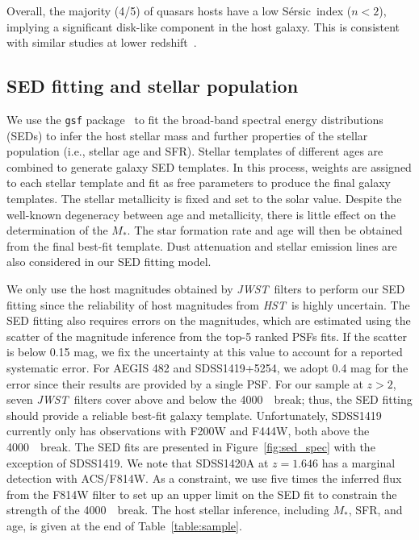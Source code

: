 \documentclass[twocolumn]{aastex631}
\newcommand{\sersic}{S\'ersic}
\newcommand{\smass}{{$M_*$}}
\newcommand{\hst}{{\it HST}}
\newcommand{\jwst}{{\it JWST}}
\newcommand{\angstrom}{\text{\normalfont\AA}}
\begin{document}
Overall, the majority (4/5) of quasars hosts have a low \sersic\ index ($n<2$), implying a significant disk-like component in the host galaxy. This is consistent with similar studies at lower redshift~\citep[e.g.,][]{Schawinski2012,Ding2020,Li2021,Zhuang2022}.


\subsection{SED fitting and stellar population}


We use the \texttt{gsf} package~\citep{Morishita2019} to fit the broad-band spectral energy distributions (SEDs) to infer the host stellar mass and further properties of the stellar population (i.e., stellar age and SFR). 
Stellar templates of different ages are combined to generate galaxy SED templates. In this process, weights are assigned to each stellar template and fit as free parameters to produce the final galaxy templates.
The stellar metallicity is fixed and set to the solar value. Despite the well-known degeneracy between age and metallicity, there is little effect on the determination of the \smass. The star formation rate and age will then be obtained from the final best-fit template. Dust attenuation and stellar emission lines are also considered in our SED fitting model.

We only use the host magnitudes obtained by \jwst\ filters to perform our SED fitting since the reliability of host magnitudes from \hst\ is highly uncertain. 
The SED fitting also requires errors on the magnitudes, which are estimated using the scatter of the magnitude inference from the top-5 ranked PSFs fits. If the scatter is below 0.15 mag, we fix the uncertainty at this value to account for a reported systematic error. For AEGIS 482 and SDSS1419+5254, we adopt 0.4 mag for the error since their results are provided by a single PSF.
For our sample at $z>2$, seven \jwst\ filters cover above and below the 4000~\angstrom\ break; thus, the SED fitting should provide a reliable best-fit galaxy template. Unfortunately, SDSS1419 currently only has observations with F200W and F444W, both above the 4000~\angstrom\ break. The SED fits are presented in Figure~\ref{fig:sed_spec} with the exception of SDSS1419. We note that SDSS1420A at $z=1.646$ has a marginal detection with ACS/F814W. As a constraint, we use five times the inferred flux from the F814W filter to set up an upper limit on the SED fit to constrain the strength of the 4000~\angstrom\ break. The host stellar inference, including \smass, SFR, and age, is given at the end of Table~\ref{table:sample}. 
\end{document}
